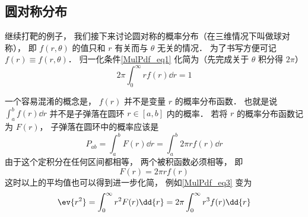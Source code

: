 
\subsection{圆对称分布}
继续打靶的例子， 我们接下来讨论圆对称的概率分布（在三维情况下叫做球对称）， 即 $f(r, \theta)$ 的值只和 $r$ 有关而与 $\theta$ 无关的情况． 为了书写方便可记 $f(r) \equiv f(r, \theta)$． 归一化条件\autoref{MulPdf_eq1} 化简为（先完成关于 $\theta$ 积分得 $2\pi$）
\begin{equation}
2\pi \int_0^\infty r f(r) \dd{r} = 1
\end{equation}

一个容易混淆的概念是， $f(r)$ 并不是变量 $r$ 的概率分布函数． 也就是说 $\int_a^b f(r) \dd{r}$ 并不是子弹落在圆环 $r \in [a, b]$ 内的概率． 若将 $r$ 的概率分布函数记为 $F(r)$， 子弹落在圆环中的概率应该是
\begin{equation}\label{MulPdf_eq4}
P_{ab} = \int_a^b F(r) \dd{r} = \int_a^b 2\pi r f(r) \dd{r}
\end{equation}
由于这个定积分在任何区间都相等， 两个被积函数必须相等， 即
\begin{equation}\label{MulPdf_eq5}
F(r) = 2\pi r f(r)
\end{equation}
这时以上的平均值也可以得到进一步化简， 例如\autoref{MulPdf_eq3} 变为
\begin{equation}
\ev{r^2} = \int_0^\infty r^2 F(r) \dd{r}
= 2\pi \int_0^\infty r^3 f(r) \dd{r}
\end{equation}

